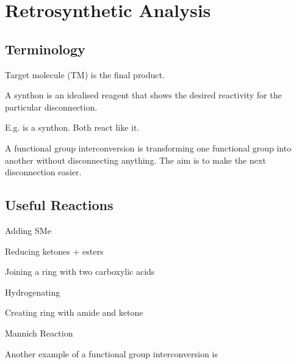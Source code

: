 \section{Retrosynthetic Analysis}

\subsection{Terminology}

Target molecule (TM) is the final product.

A synthon is an idealised reagent that shows the desired reactivity for the
particular disconnection.

E.g.  is a synthon. Both  react like it.

A functional group interconversion is transforming one functional group into
another without disconnecting anything. The aim is to make the next disconnection
easier.


\subsection{Useful Reactions}

Adding SMe ~~~~~~~~~~~~~


Reducing ketones + esters ~~~~~~~~~~~~~


Joining a ring with two carboxylic acids ~~~~~~~~~~~~~


Hydrogenating  ~~~~~~~~~~~~~


Creating ring with amide and ketone ~~~~~~~~~~~~~


Mannich Reaction ~~~~~~~~~~~~~


Another example of a functional group interconversion is ~~~~~~~~~~~~~

